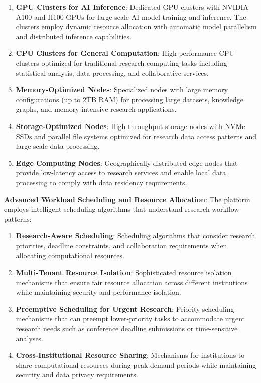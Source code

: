 \documentclass[10pt,twocolumn]{article}
\begin{document}
\begin{enumerate}
    \item \textbf{GPU Clusters for AI Inference}: Dedicated GPU clusters with NVIDIA A100 and H100 GPUs for large-scale AI model training and inference. The clusters employ dynamic resource allocation with automatic model parallelism and distributed inference capabilities.
    
    \item \textbf{CPU Clusters for General Computation}: High-performance CPU clusters optimized for traditional research computing tasks including statistical analysis, data processing, and collaborative services.
    
    \item \textbf{Memory-Optimized Nodes}: Specialized nodes with large memory configurations (up to 2TB RAM) for processing large datasets, knowledge graphs, and memory-intensive research applications.
    
    \item \textbf{Storage-Optimized Nodes}: High-throughput storage nodes with NVMe SSDs and parallel file systems optimized for research data access patterns and large-scale data processing.
    
    \item \textbf{Edge Computing Nodes}: Geographically distributed edge nodes that provide low-latency access to research services and enable local data processing to comply with data residency requirements.
\end{enumerate}

\textbf{Advanced Workload Scheduling and Resource Allocation}: The platform employs intelligent scheduling algorithms that understand research workflow patterns:

\begin{enumerate}
    \item \textbf{Research-Aware Scheduling}: Scheduling algorithms that consider research priorities, deadline constraints, and collaboration requirements when allocating computational resources.
    
    \item \textbf{Multi-Tenant Resource Isolation}: Sophisticated resource isolation mechanisms that ensure fair resource allocation across different institutions while maintaining security and performance isolation.
    
    \item \textbf{Preemptive Scheduling for Urgent Research}: Priority scheduling mechanisms that can preempt lower-priority tasks to accommodate urgent research needs such as conference deadline submissions or time-sensitive analyses.
    
    \item \textbf{Cross-Institutional Resource Sharing}: Mechanisms for institutions to share computational resources during peak demand periods while maintaining security and data privacy requirements.
\end{enumerate}
\end{document}
